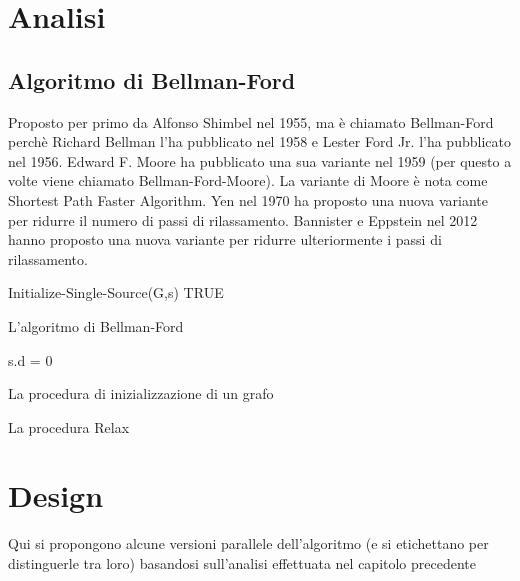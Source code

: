 \documentclass{article}
\begin{document}
	\section{Analisi}
	\label{section:analisi}
	\subsection{Algoritmo di Bellman-Ford}
	Proposto per primo da Alfonso Shimbel nel 1955, ma è chiamato Bellman-Ford perchè Richard Bellman l'ha pubblicato nel 1958 e Lester Ford Jr. l'ha pubblicato nel 1956. Edward F. Moore ha pubblicato una sua variante nel 1959 (per questo a volte viene chiamato Bellman-Ford-Moore). La variante di Moore è nota come Shortest Path Faster Algorithm. Yen nel 1970 ha proposto una nuova variante per ridurre il numero di passi di rilassamento. Bannister e Eppstein nel 2012 hanno proposto una nuova variante per ridurre ulteriormente i passi di rilassamento.
	
	\begin{algorithm}[H]
		Initialize-Single-Source(G,s)\;
		\Return TRUE\;
		\caption{L'algoritmo di Bellman-Ford}
	\end{algorithm}

	\begin{algorithm}[H]
		s.d = 0\;
		\caption{La procedura di inizializzazione di un grafo}
	\end{algorithm}

	\begin{algorithm}[H]
		\caption{La procedura Relax}
	\end{algorithm}
	
	\section{Design}
	\label{section:design}
	Qui si propongono alcune versioni parallele dell'algoritmo (e si etichettano per distinguerle tra loro) basandosi sull'analisi effettuata nel capitolo precedente
	
\end{document}
